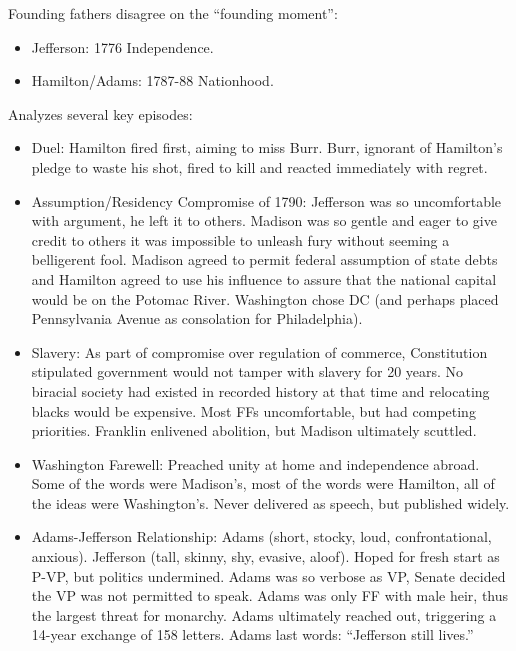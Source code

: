 \documentclass[
]{article}
\begin{document}
Founding fathers disagree on the ``founding moment'':

\begin{itemize}
\item
  Jefferson: 1776 Independence.
\item
  Hamilton/Adams: 1787-88 Nationhood.
\end{itemize}

Analyzes several key episodes:

\begin{itemize}
\item
  Duel: Hamilton fired first, aiming to miss Burr. Burr, ignorant of
  Hamilton's pledge to waste his shot, fired to kill and reacted
  immediately with regret.
\item
  Assumption/Residency Compromise of 1790: Jefferson was so
  uncomfortable with argument, he left it to others. Madison was so
  gentle and eager to give credit to others it was impossible to unleash
  fury without seeming a belligerent fool. Madison agreed to permit
  federal assumption of state debts and Hamilton agreed to use his
  influence to assure that the national capital would be on the Potomac
  River. Washington chose DC (and perhaps placed Pennsylvania Avenue as
  consolation for Philadelphia).
\item
  Slavery: As part of compromise over regulation of commerce,
  Constitution stipulated government would not tamper with slavery for
  20 years. No biracial society had existed in recorded history at that
  time and relocating blacks would be expensive. Most FFs uncomfortable,
  but had competing priorities. Franklin enlivened abolition, but
  Madison ultimately scuttled.
\item
  Washington Farewell: Preached unity at home and independence abroad.
  Some of the words were Madison's, most of the words were Hamilton, all
  of the ideas were Washington's. Never delivered as speech, but
  published widely.
\item
  Adams-Jefferson Relationship: Adams (short, stocky, loud,
  confrontational, anxious). Jefferson (tall, skinny, shy, evasive,
  aloof). Hoped for fresh start as P-VP, but politics undermined. Adams
  was so verbose as VP, Senate decided the VP was not permitted to
  speak. Adams was only FF with male heir, thus the largest threat for
  monarchy. Adams ultimately reached out, triggering a 14-year exchange
  of 158 letters. Adams last words: ``Jefferson still lives.''
\end{itemize}
\end{document}
